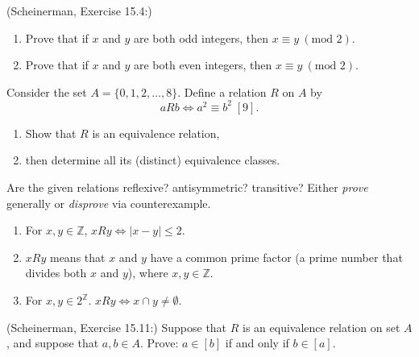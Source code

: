 \documentclass{article}
\newcommand{\Z}{\mathbb{Z}}
\newcommand{\modulo}{\text{mod }}
\theoremstyle{definition}
\begin{document}
\begin{question}
    (Scheinerman, Exercise 15.4:)
    \begin{enumerate}
        \item Prove that if $x$ and $y$ are both odd integers, then $x \equiv y \ (\modulo 2)$.
        \item Prove that if $x$ and $y$ are both even integers, then $x \equiv y \ (\modulo 2)$.
    \end{enumerate}
\end{question}
\begin{solution}
\end{solution}


\begin{question}
    Consider the set $A = \{0, 1, 2, \dots, 8 \}$. Define a relation $R$ on $A$ by
	\[
	a R b \iff a^2 \equiv b^2 \; [9].
	\]
	\begin{enumerate}
	\item Show that $R$ is an equivalence relation, 
	\item then determine all its (distinct) equivalence classes.
	\end{enumerate}
\end{question}
\begin{solution}
\end{solution}


\begin{question}
    Are the given relations reflexive? antisymmetric? transitive? Either \textit{prove} generally or \textit{disprove} via 
    counterexample.
    	\begin{enumerate}
	\item For $x, y \in \Z$,  $x R y \iff |x - y| \leq 2$. 
	\item  $x R y$ means that $x$ and $y$ have a common prime factor (a prime number that divides both $x$ and $y$), 
	where $x, y \in \Z$.
	\item For $x, y \in 2^{\Z}$. $x R y \iff x \cap y \neq \emptyset$.
	\end{enumerate}
\end{question}
\begin{solution}
\end{solution}


\begin{question}
    (Scheinerman, Exercise 15.11:)
    Suppose that $R$ is an equivalence relation on  set $A$, and suppose that $a, b \in A$.
    Prove: $a \in [b]$ if and only if $b \in [a]$.
\end{question}
\begin{solution}
\end{solution}
\end{document}
